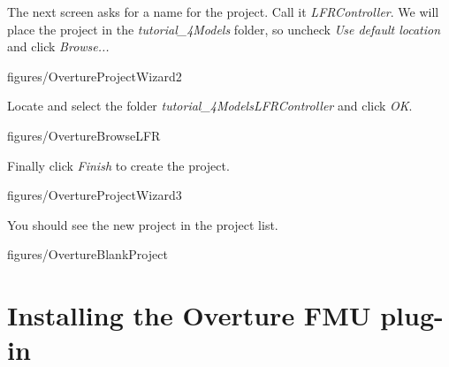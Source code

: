 \documentclass[11pt,a4paper]{../tutorial}
\begin{document}
\begin{instructions}
\item The next screen asks for a name for the project. Call it \emph{LFRController}. We will place the project in the \emph{tutorial\_4\pathsep{}Models} folder, so uncheck \emph{Use default location} and click \emph{Browse...}

    \begin{annotation}[width=0.6\linewidth]{figures/OvertureProjectWizard2}
    \end{annotation}

\newpage
\item Locate and select the folder \emph{tutorial\_4\pathsep{}Models\pathsep{}LFRController} and click \emph{OK}.

    \begin{annotation}[width=0.55\linewidth]{figures/OvertureBrowseLFR}
    \end{annotation}

\item Finally click \emph{Finish} to create the project.

    \begin{annotation}[width=0.6\linewidth]{figures/OvertureProjectWizard3}
    \end{annotation}

    You should see the new project in the project list.

    \begin{annotation}[width=\linewidth,trim=0 400 0 0,clip]{figures/OvertureBlankProject}
    \end{annotation}

\end{instructions}


\section{Installing the Overture FMU plug-in}
\end{document}
